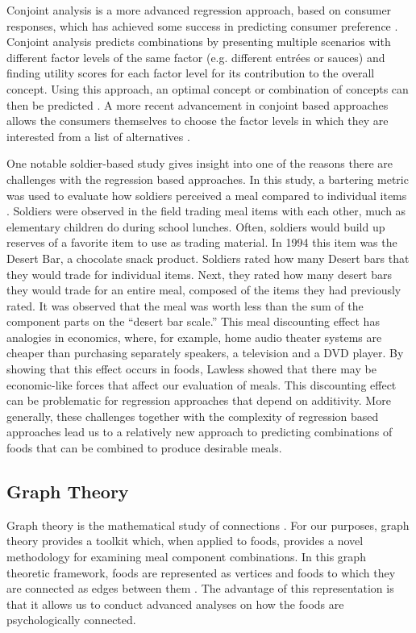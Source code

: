 Conjoint analysis is a more advanced regression approach, based on consumer responses, which has achieved some success in predicting consumer preference \citep{Green1978,Luce1964}.  Conjoint analysis predicts combinations by presenting multiple scenarios with different factor levels of the same factor (e.g. different entr\'{e}es or sauces) and finding utility scores for each factor level for its contribution to the overall concept.  Using this approach, an optimal concept or combination of concepts can then be predicted \citep{Moskowitz2006a}.  A more recent advancement in conjoint based approaches allows the consumers themselves to choose the factor levels in which they are interested from a list of alternatives \citep{Liechty2001}.

One notable soldier-based study gives insight into one of the reasons there are challenges with the regression based approaches.  In this study, a bartering metric was used to evaluate how soldiers perceived a meal compared to individual items \citep{Lawless1994}.  Soldiers were observed in the field trading meal items with each other, much as elementary children do during school lunches.  Often, soldiers would build up reserves of a favorite item to use as trading material.  In 1994 this item was the Desert Bar, a chocolate snack product.  Soldiers rated how many Desert bars that they would trade for individual items.  Next, they rated how many desert bars they would trade for an entire meal, composed of the items they had previously rated.  It was observed that the meal was worth less than the sum of the component parts on the “desert bar scale.”  This meal discounting effect has analogies in economics, where, for example, home audio theater systems are cheaper than purchasing separately speakers, a television and a DVD player.  By showing that this effect occurs in foods, Lawless showed that there may be economic-like forces that affect our evaluation of meals.  This discounting effect can be problematic for regression approaches that depend on additivity.  More generally, these challenges together with the complexity of regression based approaches lead us to a relatively new approach to predicting combinations of foods that can be combined to produce desirable meals.

\subsection{Graph Theory}

Graph theory is the mathematical study of connections \citep{Bollobaas1998}.  For our purposes, graph theory  provides a toolkit which, when applied to foods, provides a novel methodology for examining meal component combinations.  In this graph theoretic framework, foods are represented as vertices and foods to which they are connected as edges between them \citep{Ennis2011}.  The advantage of this representation is that it allows us to conduct advanced analyses on how the foods are psychologically connected.  

